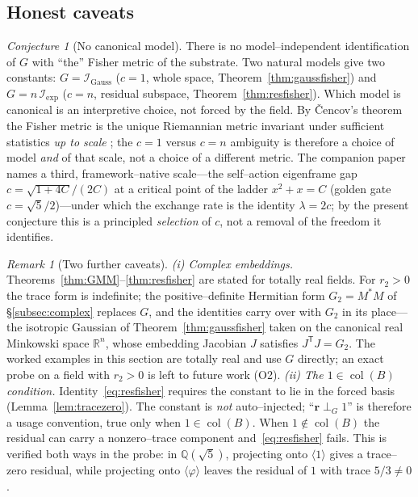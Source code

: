 \documentclass[11pt]{article}
\theoremstyle{plain}
\theoremstyle{definition}
\theoremstyle{remark}
\newtheorem{remark}[theorem]{Remark}
\newtheorem{conjecture}[theorem]{Conjecture}
\newcommand{\Q}{\mathbb{Q}}
\newcommand{\R}{\mathbb{R}}
\newcommand{\Fish}{\mathcal{I}}
\newcommand{\rr}{\mathbf{r}}
\newcommand{\GG}{G}
\newcommand{\BB}{B}
\newcommand{\transpose}{^{\mathsf{T}}}
\DeclareMathOperator{\col}{col}
\begin{document}
\subsection{Honest caveats}
\begin{conjecture}[No canonical model]\label{conj:model}
There is no model--independent identification of $\GG$ with ``the'' Fisher metric of the substrate. Two
natural models give two constants: $\GG=\Fish_{\mathrm{Gauss}}$ ($c=1$, whole space,
Theorem~\ref{thm:gaussfisher}) and $\GG=n\,\Fish_{\mathrm{exp}}$ ($c=n$, residual subspace,
Theorem~\ref{thm:resfisher}). Which model is canonical is an interpretive choice, not forced by the field.
By \v{C}encov's theorem the Fisher metric is the unique Riemannian metric invariant under sufficient
statistics \emph{up to scale} \cite{Cencov}; the $c=1$ versus $c=n$ ambiguity is therefore a choice of model
\emph{and} of that scale, not a choice of a different metric. The companion paper names a third,
framework--native scale---the self--action eigenframe gap $c=\sqrt{1+4C}/(2C)$ at a critical point of the
ladder $x^2+x=C$ (golden gate $c=\sqrt5/2$)---under which the exchange rate is the identity $\lambda=2c$; by the
present conjecture this is a principled \emph{selection} of $c$, not a removal of the freedom it identifies.
\end{conjecture}
\begin{remark}[Two further caveats]\label{rem:fishercaveats}
\emph{(i) Complex embeddings.} Theorems~\ref{thm:GMM}--\ref{thm:resfisher} are stated for totally real fields.
For $r_2>0$ the trace form is indefinite; the positive--definite Hermitian form $G_2=M^{*}M$ of
\S\ref{subsec:complex} replaces $\GG$, and the identities carry over with $G_2$ in its place---the isotropic
Gaussian of Theorem~\ref{thm:gaussfisher} taken on the canonical real Minkowski space $\R^n$, whose
embedding Jacobian $J$ satisfies $J\transpose J=G_2$. The worked examples in this section are totally real and
use $\GG$ directly; an exact probe on a field with $r_2>0$ is left to future work (O2).
\emph{(ii) The $1\in\col(\BB)$ condition.} Identity~\eqref{eq:resfisher} requires the constant to lie in the
forced basis (Lemma~\ref{lem:tracezero}). The constant is \emph{not} auto--injected; ``$\rr\perp_{\GG}1$''
is therefore a usage convention, true only when $1\in\col(\BB)$. When $1\notin\col(\BB)$ the residual can
carry a nonzero--trace component and~\eqref{eq:resfisher} fails. This is verified both ways in the probe: in
$\Q(\sqrt5)$, projecting onto $\langle 1\rangle$ gives a trace--zero residual, while projecting onto
$\langle\varphi\rangle$ leaves the residual of $1$ with trace $5/3\neq 0$.
\end{remark}
\end{document}
